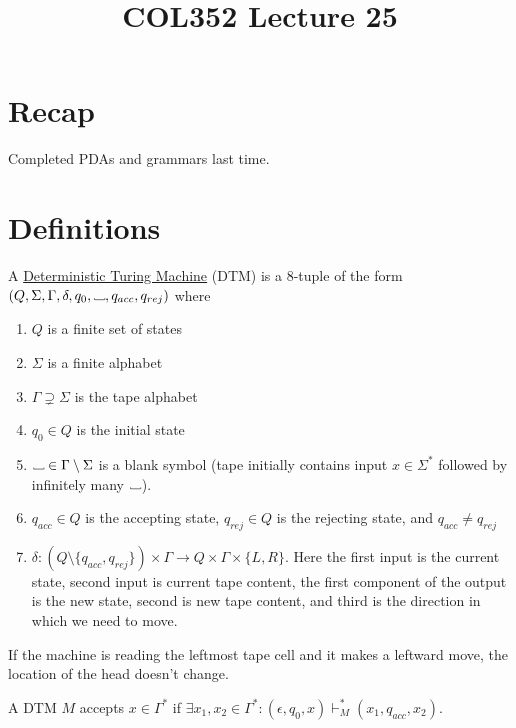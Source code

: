 \documentclass[a4paper]{article}
\title{\textbf{COL352 Lecture 25}}
\date{}
\newcommand{\changesto}{\vdash}
\newcommand\Vtextvisiblespace[1][.3em]{%
    \mbox{\kern.06em\vrule height.3ex}%
    \vbox{\hrule width#1}%
    \hbox{\vrule height.3ex}
}
\newcommand{\blank}{{\Vtextvisiblespace[0.7em]}}
\begin{document}
\maketitle
\tableofcontents

\section{Recap}

Completed PDAs and grammars last time.

\section{Definitions}

\begin{defn}
    A \underline{Deterministic Turing Machine} (DTM) is a 8-tuple of the form $(Q, \Sigma, \Gamma, \delta, q_0, \blank, q_{acc}, q_{rej})$ where
    \begin{enumerate}
        \item $Q$ is a finite set of states
        \item $\Sigma$ is a finite alphabet
        \item $\Gamma \supsetneq \Sigma$ is the tape alphabet
        \item $q_0 \in Q$ is the initial state
        \item $\blank \in \Gamma \setminus \Sigma$ is a blank symbol (tape initially contains input $x \in \Sigma^*$ followed by infinitely many $\blank$).
        \item $q_{acc} \in Q$ is the accepting state, $q_{rej} \in Q$ is the rejecting state, and $q_{acc} \ne q_{rej}$
        \item $\delta : (Q \setminus \{q_{acc}, q_{rej}\}) \times \Gamma \to Q \times \Gamma \times \{L, R\}$.
            Here the first input is the current state, second input is current tape content, the first component of the output is the new state, second is new tape content, and third is the
            direction in which we need to move.
    \end{enumerate}
    If the machine is reading the leftmost tape cell and it makes a leftward move, the location of the head doesn't change.
\end{defn}

\begin{defn}
    A DTM $M$ accepts $x \in \Gamma^*$ if $\exists x_1, x_2 \in \Gamma^* : (\epsilon, q_0, x) \changesto^*_M (x_1, q_{acc}, x_2)$.
\end{defn}
\end{document}
